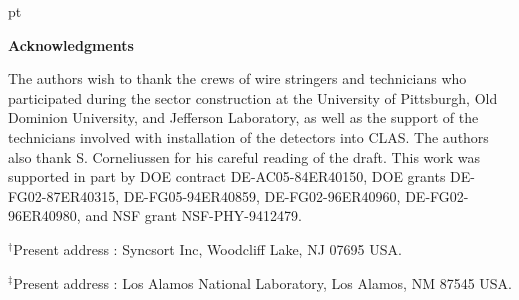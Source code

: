 pt

{\large{\bf Acknowledgments}}

\vskip 10pt

The authors wish to thank the crews of wire stringers and technicians who 
participated during the sector construction at the University of Pittsburgh,
Old Dominion University, and Jefferson Laboratory, as well as the support of 
the technicians involved with installation of the detectors into CLAS.  The
authors also thank S. Corneliussen for his careful reading of the draft.  This
work was supported in part by DOE contract DE-AC05-84ER40150, DOE grants 
DE-FG02-87ER40315, DE-FG05-94ER40859, DE-FG02-96ER40960, DE-FG02-96ER40980, 
and NSF grant NSF-PHY-9412479.

\vskip 10pt

\noindent
$^{\dagger}$Present address : Syncsort Inc, Woodcliff Lake, NJ 07695 USA.

\noindent
$^{\ddagger}$Present address : Los Alamos National Laboratory, Los Alamos, NM
87545 USA.


